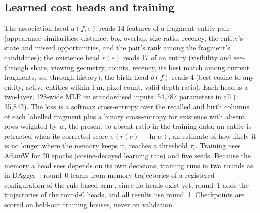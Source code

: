 \subsection{Learned cost heads and training}
The association head $a(f,e)$ reads 14 features of a fragment--entity pair (appearance similarities, distance, box overlap, size ratio, recency, the entity's state and missed opportunities, and the pair's rank among the fragment's candidates); the existence head $r(e)$ reads 17 of an entity (visibility and see-through share, viewing geometry, counts, recency, its best match among current fragments, see-through history); the birth head $b(f)$ reads 4 (best cosine to any entity, active entities within 1\,m, pixel count, valid-depth ratio).
Each head is a two-layer, 128-wide MLP on standardised inputs: 54,787 parameters in all (: 35,842).
The loss is a softmax cross-entropy over the recalled and birth columns of each labelled fragment plus a binary cross-entropy for existence with absent rows weighted by $w$, the present-to-absent ratio in the training data; an entity is retracted when its corrected score $\sigma(r(e)-\ln w)$, an estimate of how likely it is no longer where the memory keeps it, reaches a threshold $\tau_r$.
Training uses AdamW for 20 epochs (cosine-decayed learning rate) and five seeds.
Because the memory a head sees depends on its own decisions, training runs in two rounds as in DAgger~\cite{dagger2011}: round~0 learns from memory trajectories of a registered configuration of the rule-based arm , since no heads exist yet; round~1 adds the trajectories of the round-0 heads, and all results use round~1.
Checkpoints are scored on held-out training houses, never on validation.


